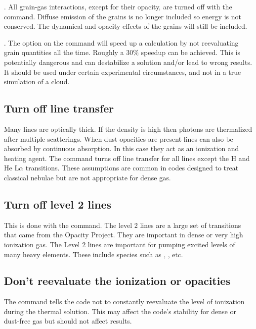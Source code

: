 .  All grain-gas interactions,
except for their opacity, are turned off with the
 command.
Diffuse emission of the grains is no longer included so energy
is not conserved.
The dynamical and opacity effects of the grains will
still be included.

.  The 
option on the  command
will speed up a calculation by not reevaluating grain quantities all the
time.
Roughly a 30\% speedup can be achieved.
This is potentially dangerous
and can destabilize a solution and/or lead to wrong results.
It should
be used under certain experimental circumstances, and not in a true
simulation of a cloud.

\subsection{Turn off line transfer}

Many lines are optically thick.
If the density is high then photons
are thermalized after multiple scatterings.
When dust opacities are present
lines can also be absorbed by continuous absorption.
In this case they
act as an ionization and heating agent.
The  command turns off line transfer
for all lines except the H and He L$\alpha $ transitions.
These assumptions are common in codes designed to treat
classical nebulae but are not appropriate for dense gas.

\subsection{Turn off level 2 lines}

This is done with the  command.
The level 2 lines are a large set of transitions that came
from the Opacity Project.
They are important in dense or very high
ionization gas.
The Level 2 lines are important for pumping excited levels
of many heavy elements.
These include species such as \ci*, \cii*, etc.

\subsection{Don't reevaluate the ionization or opacities}

The  command tells
the code not to constantly reevaluate the level of ionization
during the thermal solution.
This may affect the code's stability for dense or
dust-free gas but should not affect results.

